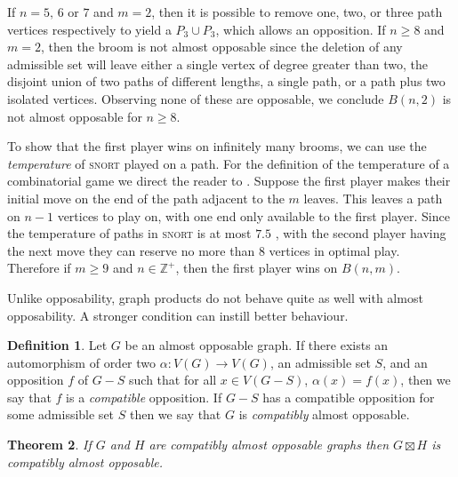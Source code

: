 \documentclass[11pt]{article}
\newtheorem{theorem}{Theorem}[section]
\theoremstyle{definition}
\newtheorem{definition}[theorem]{Definition}
\begin{document}
If $n=5,\,6$ or $7$ and $m=2$, then it is possible to remove one, two, or three
path vertices respectively to yield a $P_3\cup P_3$, which allows an
opposition. If $n\geq8$ and $m=2$, then the broom is not almost opposable since
the deletion of any admissible set will leave either a single vertex of degree
greater than two, the disjoint union of two paths of different lengths, a
single path, or a path plus two isolated vertices. Observing none of these are
opposable, we conclude $B(n,2)$ is not almost opposable for $n\geq 8$.

To show that the first player wins on infinitely many brooms, we can use the
\emph{temperature} of \textsc{snort} played on a path. For the definition of
the temperature of a combinatorial game we direct the reader to
\cite{huntemann.nowakowski.ea:bounding}. Suppose the first player makes their
initial move on the end of the path adjacent to the $m$ leaves. This leaves a
path on $n-1$ vertices to play on, with one end only available to the first
player. Since the temperature of paths in \textsc{snort} is at most $7.5$
\cite{huntemann.nowakowski.ea:bounding}, with the second player having the next
move they can reserve no more than $8$ vertices in optimal play. Therefore if
$m\geq9$ and $n\in \mathbb{Z}^+$, then the first player wins on $B(n,m)$.

Unlike opposability, graph products do not behave quite as well with almost
opposability. A stronger condition can instill better behaviour.

\begin{definition}
    Let $G$ be an almost opposable graph. If there exists an automorphism of
    order two $\alpha: V(G) \to V(G)$, an admissible set $S$, and an opposition
    $f$ of $G-S$ such that for all $x\in V(G-S)$, $\alpha(x) = f(x)$, then we
    say that $f$ is a \emph{compatible} opposition. If $G-S$ has a compatible
    opposition for some admissible set $S$ then we say that $G$ is
    \emph{compatibly} almost opposable. 
\end{definition}

\begin{theorem}
    \label{thm: a.o. graphs with automorphism strong product is a.o.}
    If $G$ and $H$ are compatibly almost opposable graphs then $G\boxtimes H$
    is compatibly almost opposable. 
\end{theorem}
\end{document}

